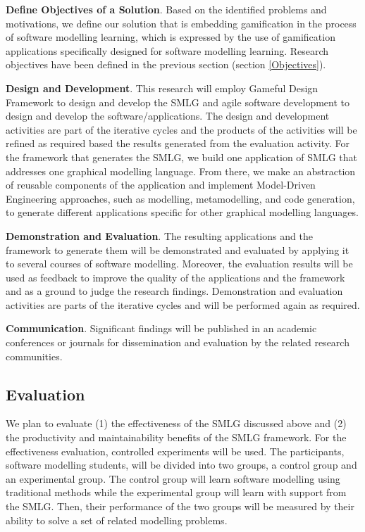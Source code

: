 \documentclass[12pt, a4paper]{report}
\begin{document}
{\textbf{Define Objectives of a Solution}. Based on the identified problems and motivations, we define our solution that is embedding gamification in the process of software modelling learning, which is expressed by the use of gamification applications specifically designed for software modelling learning. Research objectives have been defined in the previous section (section \ref{Objectives}).

\textbf{Design and Development}. This research will employ Gameful Design Framework \cite{deterding2015lens} to design and develop the SMLG and agile software development \cite{stober2010overview} to design and develop the software/applications. The design and development activities are part of the iterative cycles and the products of the activities will be refined as required based the results generated from the evaluation activity. For the framework that generates the SMLG, we build one application of SMLG that addresses one graphical modelling language. From there, we make an abstraction of reusable components of the application and implement Model-Driven Engineering approaches, such as modelling, metamodelling, and code generation, to generate different applications specific for other graphical modelling languages.   

\textbf{Demonstration and Evaluation}. The resulting applications and the framework to generate them will be demonstrated and evaluated by applying it to several courses of software modelling. Moreover, the evaluation results will be used as feedback to improve the quality of the applications and the framework and as a ground to judge the research findings. Demonstration and evaluation activities are parts of the iterative cycles and will be performed again as required. 

\textbf{Communication}. Significant findings will be published in an academic conferences or journals for dissemination and evaluation by the related research communities.

\subsection{Evaluation}
We plan to evaluate (1) the effectiveness of the SMLG discussed above and (2) the productivity and maintainability benefits of the SMLG framework. For the effectiveness evaluation, controlled experiments will be used. The participants, software modelling students, will be divided into two groups, a control group and an experimental group. The control group will learn software modelling using traditional methods while the experimental group will learn with support from the SMLG. Then, their performance of the two groups will be measured by their ability to solve a set of related modelling problems. 

}
\end{document}
